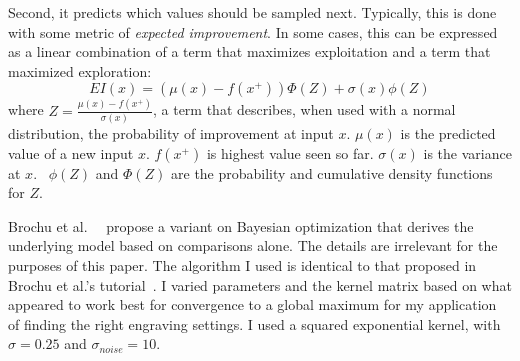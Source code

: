 Second, it predicts which values should be sampled next.
Typically, this is done with some metric of \emph{expected improvement}.
In some cases, this can be expressed as a linear combination of a term that maximizes exploitation and a term that maximized exploration:
\begin{equation}
EI (x) = (\mu(x) - f (x^+)) \Phi(Z) + \sigma(x) \phi(Z)
\end{equation}
where $Z = \frac{\mu(x) - f(x^+)}{\sigma(x)}$, a term that describes, when used with a normal distribution, the probability of improvement at input $x$.
$\mu(x)$ is the predicted value of a new input $x$.
$f(x^+)$ is highest value seen so far.
$\sigma(x)$ is the variance at $x$.~
$\phi(Z)$ and $\Phi(Z)$ are the probability and cumulative density functions for $Z$.

Brochu et al.~\cite{brochu_tutorial_2010}~\cite{brochu_active_2008} propose a variant on Bayesian optimization that derives the underlying model based on comparisons alone.
The details are irrelevant for the purposes of this paper.
The algorithm I used is identical to that proposed in Brochu et al.'s tutorial~\cite{brochu_tutorial_2010}.
I varied parameters and the kernel matrix based on what appeared to work best for convergence to a global maximum for my application of finding the right engraving settings.
I used a squared exponential kernel, with $\sigma = 0.25$ and $\sigma_{noise} = 10$.
